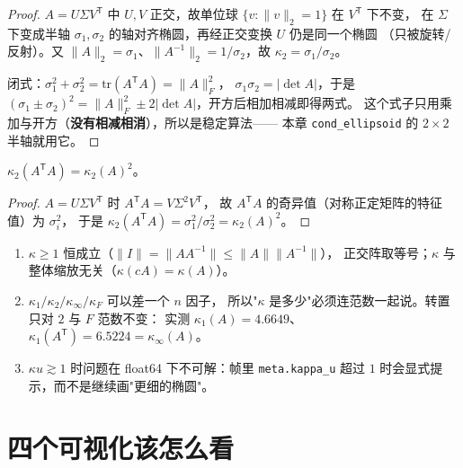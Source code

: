 \begin{proof}
$A=U\Sigma V^{\mathsf T}$ 中 $U,V$ 正交，故单位球 $\{v:\|v\|_2=1\}$ 在 $V^{\mathsf T}$ 下不变，
在 $\Sigma$ 下变成半轴 $\sigma_1,\sigma_2$ 的轴对齐椭圆，再经正交变换 $U$ 仍是同一个椭圆
（只被旋转/反射）。又 $\|A\|_2=\sigma_1$、$\|A^{-1}\|_2=1/\sigma_2$，故
$\kappa_2=\sigma_1/\sigma_2$。

闭式：$\sigma_1^2+\sigma_2^2=\mathrm{tr}(A^{\mathsf T}A)=\|A\|_F^2$，
$\sigma_1\sigma_2=|\det A|$，于是
$(\sigma_1\pm\sigma_2)^2=\|A\|_F^2\pm2|\det A|$，开方后相加相减即得两式。
这个式子只用乘加与开方（\textbf{没有相减相消}），所以是稳定算法——
本章 \texttt{cond\_ellipsoid} 的 $2\times2$ 半轴就用它。
\end{proof}

\begin{theorem}[正规方程把条件数平方]
\label{thm:gram}
$\kappa_2(A^{\mathsf T}A)=\kappa_2(A)^2$。
\end{theorem}

\begin{proof}
$A=U\Sigma V^{\mathsf T}$ 时 $A^{\mathsf T}A=V\Sigma^2V^{\mathsf T}$，
故 $A^{\mathsf T}A$ 的奇异值（对称正定矩阵的特征值）为 $\sigma_i^2$，
于是 $\kappa_2(A^{\mathsf T}A)=\sigma_1^2/\sigma_2^2=\kappa_2(A)^2$。
\end{proof}

\begin{remark}
\begin{enumerate}
  \item $\kappa\ge1$ 恒成立（$\|I\|=\|AA^{-1}\|\le\|A\|\|A^{-1}\|$），
        正交阵取等号；$\kappa$ 与整体缩放无关（$\kappa(cA)=\kappa(A)$）。
  \item $\kappa_1/\kappa_2/\kappa_\infty/\kappa_F$ 可以差一个 $n$ 因子，
        所以"$\kappa$ 是多少"必须连范数一起说。转置只对 $2$ 与 $F$ 范数不变：
        实测 $\kappa_1(A)=4.6649$、$\kappa_1(A^{\mathsf T})=6.5224=\kappa_\infty(A)$。
  \item $\kappa u\gtrsim1$ 时问题在 float64 下不可解：帧里
        \texttt{meta.kappa\_u} 超过 $1$ 时会显式提示，而不是继续画"更细的椭圆"。
\end{enumerate}
\end{remark}

\section{四个可视化该怎么看}

